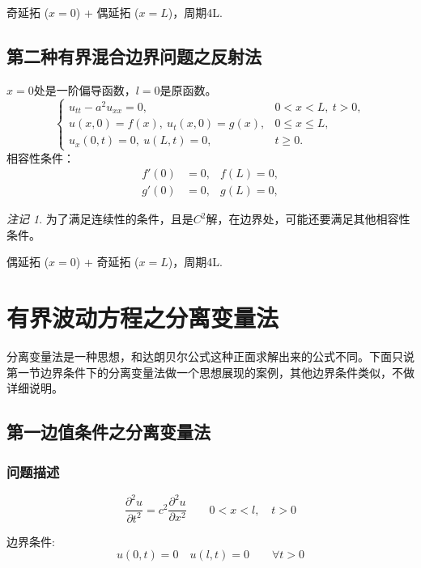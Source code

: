 \documentclass[12pt,a4paper]{article}
\numberwithin{subsection}{section}   %
\numberwithin{subsubsection}{subsection}
\theoremstyle{plain}
\theoremstyle{definition}
\theoremstyle{remark}
\newtheorem{remark}[theorem]{注记}
\theoremstyle{remark}
\begin{document}
奇延拓 ($x=0$) + 偶延拓 ($x=L$)，周期4L.


\subsection{第二种有界混合边界问题之反射法}
	$x=0$处是一阶偏导函数，$ l=0$是原函数。
		\begin{equation}
		\begin{cases}
			u_{tt} - a^2 u_{xx} = 0, & 0 < x < L, \ t > 0, \\
			u(x, 0) = f(x), \ u_t(x, 0) = g(x), & 0 \leq x \leq L, \\
			u_x(0, t) = 0, \ u(L, t) = 0, & t \geq 0.
		\end{cases}
	\end{equation}
	相容性条件：
	\begin{equation}
		\begin{aligned}
			f'(0) & = 0, & f(L)  = 0, \\
			g'(0) & =0, & g(L)  = 0,
		\end{aligned}
	\end{equation}
	\begin{remark}
		为了满足连续性的条件，且是$C^2$解，在边界处，可能还要满足其他相容性条件。
	\end{remark}
	
	偶延拓 ($x=0$) + 奇延拓 ($x=L$)，周期4L.
	


	
	
	\section{有界波动方程之分离变量法}
	分离变量法是一种思想，和达朗贝尔公式这种正面求解出来的公式不同。下面只说第一节边界条件下的分离变量法做一个思想展现的案例，其他边界条件类似，不做详细说明。
	\subsection{第一边值条件之分离变量法}
	\subsubsection{问题描述}
	\begin{equation} \label{eq:wave_equation}
		\frac{\partial^2 u}{\partial t^2} = c^2 \frac{\partial^2 u}{\partial x^2} \qquad 0 < x < l, \quad t > 0
	\end{equation}
	
	边界条件:
	\begin{equation} \label{eq:boundary_conditions}
		u(0, t) = 0 \quad u(l, t) = 0 \qquad \forall t > 0
	\end{equation}
	
\end{document}
